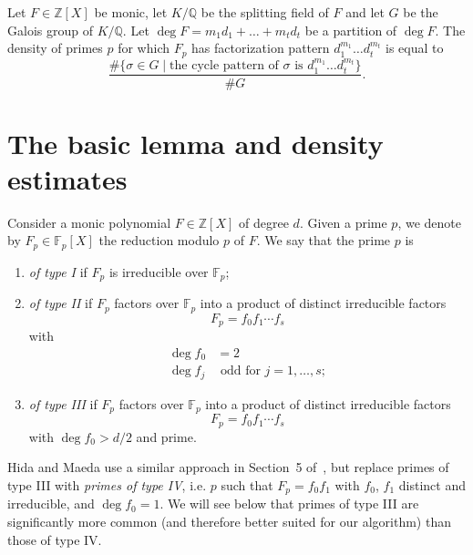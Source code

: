 \documentclass{book}
\newcommand{\ZZ}{\mathbb{Z}}
\newcommand{\FF}{\mathbb{F}}
\newcommand{\QQ}{\mathbb{Q}}
\begin{document}
\begin{theorem}[Frobenius]\label{thm:frobenius}
  Let $F\in\ZZ[X]$ be monic, let $K/\QQ$ be the splitting
  field of $F$ and let $G$ be the Galois group of $K/\QQ$.  
  Let $\deg F=m_1d_1+\ldots+m_td_t$ be a partition of $\deg F$.  
  The density of primes $p$ for which $F_p$ has factorization pattern
  $d_1^{m_1}\ldots d_t^{m_t}$ is equal to
  \begin{equation*}
    \frac{\#\{\sigma\in G\mid\text{the cycle pattern of $\sigma$ is 
    $d_1^{m_1}\ldots d_t^{m_t}$}\}
    }{\# G}.
  \end{equation*}
\end{theorem}


\section{The basic lemma and density estimates}
\label{sect:density}

Consider a monic polynomial $F\in\ZZ[X]$ of degree $d$.
Given a prime $p$, we denote by
$F_p\in\FF_p[X]$ the reduction modulo $p$ of $F$.  We say that the prime
$p$ is
\begin{enumerate}
  \item \emph{of type I} if $F_p$ is irreducible over $\FF_p$;
  \item \emph{of type II} if $F_p$ factors over $\FF_p$ into a product of
    distinct irreducible factors
    \begin{equation*}
      F_p=f_0f_1\cdots f_s
    \end{equation*}
    with
    \begin{align*}
      \deg f_0 &= 2\\
      \deg f_j &\text{ odd for }j=1,\ldots,s;
    \end{align*}
  \item \emph{of type III} if $F_p$ factors over $\FF_p$ into a product of
    distinct irreducible factors
    \begin{equation*}
      F_p=f_0f_1\cdots f_s
    \end{equation*}
    with $\deg f_0>d/2$ and prime.
\end{enumerate}

\begin{remark}\label{rmk:type4}
  Hida and Maeda use a similar approach in Section~5 of~\cite{HidaMaeda}, but 
  replace primes of type III with
  \emph{primes of type IV}, i.e. $p$ such that $F_p=f_0f_1$ with $f_0$, $f_1$
  distinct and irreducible, and $\deg f_0=1$.  We will see below that primes
  of type III are significantly more common (and therefore better suited for
  our algorithm) than those of type IV.
\end{remark}
\end{document}
